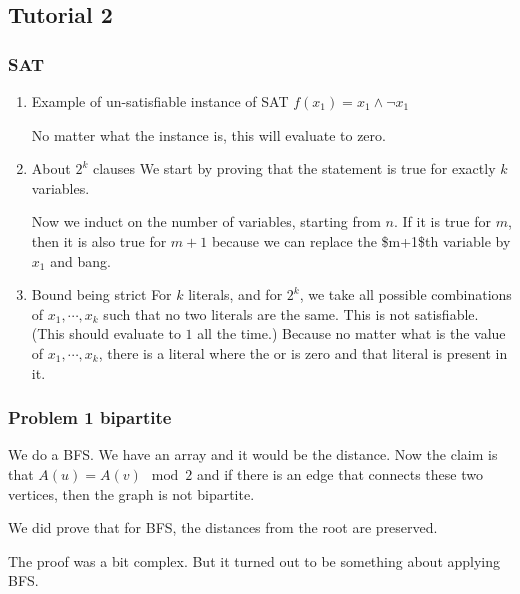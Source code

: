 \documentclass[11pt]{article}
\begin{document}
\subsection{Tutorial 2}
\label{sec:org040fd7b}
\subsubsection{SAT}
\label{sec:org29a4db3}
\begin{enumerate}
\item Example of un-satisfiable instance of SAT
\label{sec:org1c00cbe}
\(f(x_1) = x_1 \wedge \neg x_1\)

No matter what the instance is, this will evaluate to zero. 
\item About \(2^k\) clauses
\label{sec:orgec700f4}
We start by proving that the statement is true for exactly \(k\) variables. 

Now we induct on the number of variables, starting from \(n\). If it is true
for \(m\), then it is also true for \(m+1\) because we can replace the \$m+1\$th
variable by \(x_1\) and bang.
\item Bound being strict
\label{sec:org9bbaa8b}
For \(k\) literals, and for \(2^k\), we take all possible combinations of \(x_1,
     \cdots, x_k\) such that no two literals are the same. This is not
satisfiable. (This should evaluate to \(1\) all the time.) Because no matter
what is the value of \(x_1, \cdots, x_k\), there is a literal where the or is
zero and that literal is present in it.
\end{enumerate}
\subsubsection{Problem 1 bipartite}
\label{sec:orge3ee748}
We do a BFS. We have an array and it would be the distance. Now the claim is
that \(A(u) = A(v) \mod 2\) and if there is an edge that connects these two
vertices, then the graph is not bipartite.

We did prove that for BFS, the distances from the root are preserved.

The proof was a bit complex. But it turned out to be something about
applying BFS.
\end{document}
